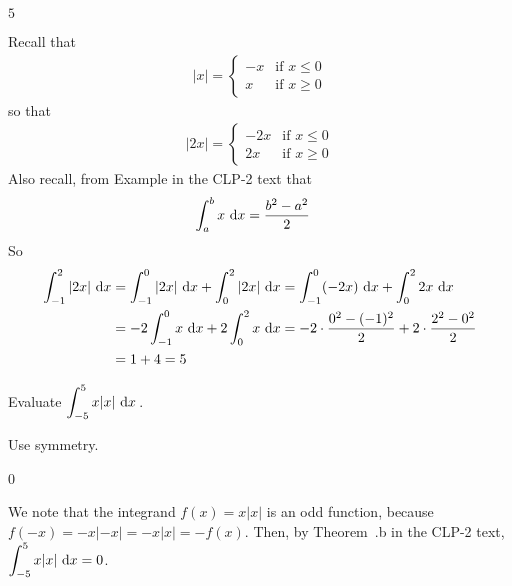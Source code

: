 \begin{answer}
$5$
\end{answer}

\begin{solution}
Recall that
\begin{align*}
|x|=\begin{cases} -x &\text{if $x\le 0$}\\
                   x &\text{if $x\ge 0$}
    \end{cases}
\end{align*}
so that
\begin{align*}
|2x|=\begin{cases} -2x &\text{if $x\le 0$}\\
                    2x &\text{if $x\ge 0$}
    \end{cases}
\end{align*}
Also recall, from  Example  in the
CLP-2 text that
\begin{align*}
\int_a^b x\ \mathrm{d}x&=\frac{b^2-a^2}{2}
\end{align*}
So
\begin{align*}
\int_{-1}^2 |2x|\ \mathrm{d}x
&=\int_{-1}^0 |2x|\ \mathrm{d}x+\int_0^2 |2x|\ \mathrm{d}x
=\int_{-1}^0 (-2x)\ \mathrm{d}x+\int_0^2 2x\ \mathrm{d}x \\
&= -2\int_{-1}^0 x\ \mathrm{d}x+2\int_0^2 x\ \mathrm{d}x
=-2\cdot\frac{0^2-(-1)^2}{2} +2\cdot\frac{2^2-0^2}{2} \\
&=1+4=5
\end{align*}


\end{solution}



\begin{question}
Evaluate $\displaystyle\int_{-5}^5 x|x|\ \dee{x}$\,.
\end{question}
\begin{hint} Use symmetry.
\end{hint}
\begin{answer} 0
\end{answer}
\begin{solution}
We note that the integrand $f(x)=x|x|$ is an odd function, because $f(-x)=-x|-x|=-x|x|=-f(x)$. Then, by Theorem~.b in the CLP-2 text,
 $\displaystyle\int_{-5}^5 x|x| \ \dee{x}=0$.
\end{solution}

